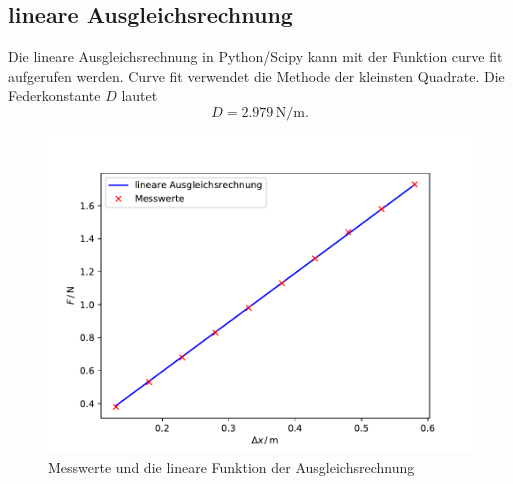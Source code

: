 \subsection{lineare Ausgleichsrechnung}
Die lineare Ausgleichsrechnung in Python/Scipy kann mit der Funktion curve fit
aufgerufen werden. Curve fit verwendet die Methode der kleinsten Quadrate.
Die Federkonstante $D$ lautet
\begin{equation}
  D=2.979 \,\mathrm{N/m}.
\end{equation}
\begin{figure}
  \label{fig:plot}
  \includegraphics[width=\textwidth]{content/plot.pdf}
\caption{Messwerte und die lineare Funktion der Ausgleichsrechnung}
\end{figure}
